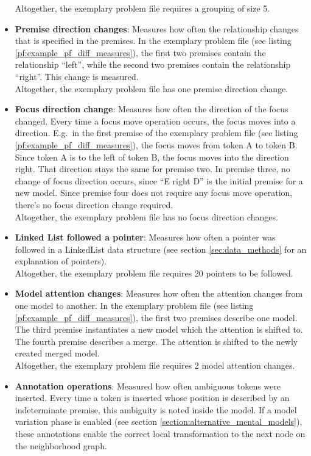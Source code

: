 \documentclass[hidelinks]{scrartcl}
\begin{document}
\begin{itemize}
	Altogether, the exemplary problem file requires a grouping of size 5.
	\item \textbf{Premise direction changes}: Measures how often the relationship changes that is specified in the premises. In the exemplary problem file (see listing \ref{pf:example_pf_diff_measures}), the first two premises contain the relationship ``left'', while the second two premises contain the relationship ``right''. This change is measured. \\
	Altogether, the exemplary problem file has one premise direction change.
	\item \textbf{Focus direction change}: Measures how often the direction of the focus changed. Every time a focus move operation occurs, the focus moves into a direction. E.g.\ in the first premise of the exemplary problem file (see listing \ref{pf:example_pf_diff_measures}), the focus moves from token A to token B. Since token A is to the left of token B, the focus moves into the direction right. That direction stays the same for premise two. In premise three, no change of focus direction occurs, since ``E right D'' is the initial premise for a new model. Since premise four does not require any focus move operation, there's no focus direction change required. \\
	Altogether, the exemplary problem file has no focus direction changes.
	\item \textbf{Linked List followed a pointer}: Measures how often a pointer was followed in a LinkedList data structure (see section \ref{sec:data_methods} for an explanation of pointers). \\
	Altogether, the exemplary problem file requires 20 pointers to be followed.
	\item \textbf{Model attention changes}: Measures how often the attention changes from one model to another. In the exemplary problem file (see listing \ref{pf:example_pf_diff_measures}), the first two premises describe one model. The third premise instantiates a new model which the attention is shifted to. The fourth premise describes a merge. The attention is shifted to the newly created merged model. \\
	Altogether, the exemplary problem file requires 2 model attention changes.
	\item \textbf{Annotation operations}: Measured how often ambiguous tokens were inserted. Every time a token is inserted whose position is described by an indeterminate premise, this ambiguity is noted inside the model. If a model variation phase is enabled (see section \ref{section:alternative_mental_models}), these annotations enable the correct local transformation to the next node on the neighborhood graph. \\

\end{itemize}
\end{document}
